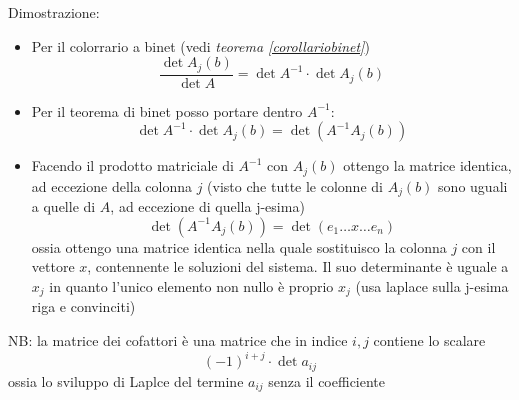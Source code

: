 \documentclass[12pt,a4paper,oneside]{article}
\begin{document}
\label{Cramer}
Dimostrazione:
\begin{itemize}
	\item Per il colorrario a binet (vedi \textit{teorema  \ref{corollariobinet}})
	      \[
		      \frac{ \det A_j \left( b \right) }{ \det A} = \det A^{-1} \cdot \det A_j\left( b \right)
	      \]
	\item Per il teorema di binet posso portare dentro $ A^{-1} $:
	      \[
		      \det A^{-1} \cdot \det A_j\left( b \right) = \det \left( A^{-1}A_j\left( b \right)  \right)
	      \]
	\item Facendo il prodotto matriciale di $ A^{-1} $ con $ A_j \left( b \right)  $ ottengo la matrice identica, ad eccezione della colonna $ j $ (visto che tutte le colonne di $ A_j\left( b \right)  $ sono uguali a quelle di $ A $, ad eccezione di quella j-esima)
	      \[
		      \det \left( A^{-1}A_j\left( b \right)  \right) = \det  \left( e_1\ldots x\ldots e_n \right)
	      \]
	      ossia ottengo una matrice identica nella quale sostituisco la colonna $ j $ con il vettore $ x $, contennente le soluzioni del sistema. Il suo determinante è uguale a $ x_j $ in quanto l'unico elemento non nullo è proprio $ x_j $ (usa laplace sulla j-esima riga e convinciti)

\end{itemize}

NB: la matrice dei cofattori è una matrice che in indice $ i,j $ contiene lo scalare
\[
	\left( -1 \right) ^{i+j} \cdot \det a_{ij}
\]
ossia lo sviluppo di Laplce del termine $ a_{ij} $ senza il coefficiente
\end{document}
